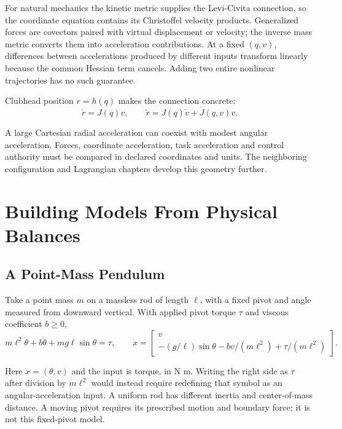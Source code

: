 For natural mechanics the kinetic metric supplies the Levi-Civita connection, so the coordinate equation contains its Christoffel velocity products. Generalized forces are covectors paired with virtual displacement or velocity; the inverse mass metric converts them into acceleration contributions. At a fixed $(q,v)$, differences between accelerations produced by different inputs transform linearly because the common Hessian term cancels. Adding two entire nonlinear trajectories has no such guarantee.

Clubhead position $r=h(q)$ makes the connection concrete:
\begin{equation}
\label{eq:state_task_acceleration}
 \dot r=J(q)v,\qquad \ddot r=J(q)\dot v+\dot J(q,v)v.
\end{equation}

A large Cartesian radial acceleration can coexist with modest angular acceleration. Forces, coordinate acceleration, task acceleration and control authority must be compared in declared coordinates and units. The neighboring configuration and Lagrangian chapters develop this geometry further.

\section{Building Models From Physical Balances}
\label{sec:state_space_rep}

\subsection{A Point-Mass Pendulum}
\label{ex:pendulum}
\label{ex:pendulum_state}

Take a point mass $m$ on a massless rod of length $\ell$, with a fixed pivot and angle measured from downward vertical. With applied pivot torque $\tau$ and viscous coefficient $b\geq0$,
\begin{equation}
\label{eq:pendulum_eom}
 m\ell^2\ddot\theta+b\dot\theta+mg\ell\sin\theta=\tau,
 \qquad
 \dot x=\begin{bmatrix}v\\-(g/\ell)\sin\theta-bv/(m\ell^2)+\tau/(m\ell^2)\end{bmatrix}.
\end{equation}

Here $x=(\theta,v)$ and the input is torque, in N m. Writing the right side as $\tau$ after division by $m\ell^2$ would instead require redefining that symbol as an angular-acceleration input. A uniform rod has different inertia and center-of-mass distance. A moving pivot requires its prescribed motion and boundary force; it is not this fixed-pivot model.

